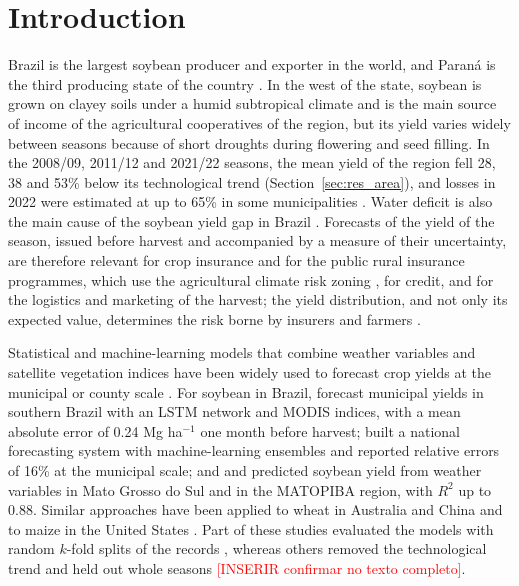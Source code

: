 \documentclass[pdflatex,sn-basic]{sn-jnl}
\newcommand{\inserir}[1]{\textcolor{red}{[INSERIR #1]}}
\begin{document}

\maketitle

\section{Introduction}\label{sec:intro}

Brazil is the largest soybean producer and exporter in the world, and Paraná is the third producing state of the country \citep{USDA2025,Conab2024}. In the west of the state, soybean is grown on clayey soils under a humid subtropical climate and is the main source of income of the agricultural cooperatives of the region, but its yield varies widely between seasons because of short droughts during flowering and seed filling. In the 2008/09, 2011/12 and 2021/22 seasons, the mean yield of the region fell 28, 38 and 53\% below its technological trend (Section~\ref{sec:res_area}), and losses in 2022 were estimated at up to 65\% in some municipalities \citep{idrparana2022}. Water deficit is also the main cause of the soybean yield gap in Brazil \citep{sentelhas2015}. Forecasts of the yield of the season, issued before harvest and accompanied by a measure of their uncertainty, are therefore relevant for crop insurance and for the public rural insurance programmes, which use the agricultural climate risk zoning \citep{brasil2025zarc}, for credit, and for the logistics and marketing of the harvest; the yield distribution, and not only its expected value, determines the risk borne by insurers and farmers \citep{pala2026}.

Statistical and machine-learning models that combine weather variables and satellite vegetation indices have been widely used to forecast crop yields at the municipal or county scale \citep{lobell2010,vanklompenburg2020,paudel2021}. For soybean in Brazil, \citet{Schwalbert2020} forecast municipal yields in southern Brazil with an LSTM network and MODIS indices, with a mean absolute error of 0.24 Mg ha$^{-1}$ one month before harvest; \citet{vonBloh2023} built a national forecasting system with machine-learning ensembles and reported relative errors of 16\% at the municipal scale; and \citet{Torsoni2023} and \citet{BarbosadosSantos2021} predicted soybean yield from weather variables in Mato Grosso do Sul and in the MATOPIBA region, with $R^2$ up to 0.88. Similar approaches have been applied to wheat in Australia and China \citep{cai2019,Cao2021} and to maize in the United States \citep{Jin2017,kang2020}. Part of these studies evaluated the models with random $k$-fold splits of the records \citep{Torsoni2023,BarbosadosSantos2021}, whereas others removed the technological trend and held out whole seasons \citep{Schwalbert2020,vonBloh2023} \inserir{confirmar no texto completo}.
\end{document}

